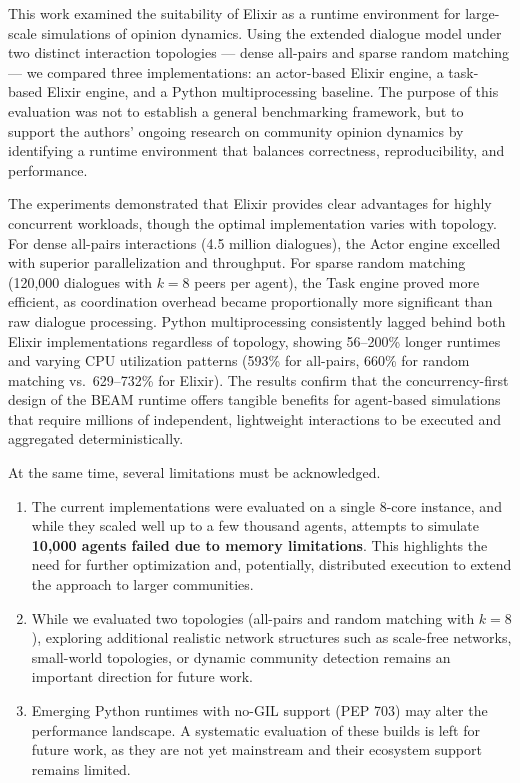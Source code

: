 \documentclass[
]{ceurart}
\begin{document}
This work examined the suitability of Elixir as a runtime environment for large-scale simulations of opinion dynamics. Using the extended dialogue model under two distinct interaction topologies --- dense all-pairs and sparse random matching --- we compared three implementations: an actor-based Elixir engine, a task-based Elixir engine, and a Python multiprocessing baseline. The purpose of this evaluation was not to establish a general benchmarking framework, but to support the authors' ongoing research on community opinion dynamics by identifying a runtime environment that balances correctness, reproducibility, and performance.

The experiments demonstrated that Elixir provides clear advantages for highly concurrent workloads, though the optimal implementation varies with topology. For dense all-pairs interactions (4.5 million dialogues), the Actor engine excelled with superior parallelization and throughput. For sparse random matching (120,000 dialogues with $k=8$ peers per agent), the Task engine proved more efficient, as coordination overhead became proportionally more significant than raw dialogue processing. Python multiprocessing consistently lagged behind both Elixir implementations regardless of topology, showing 56--200\% longer runtimes and varying CPU utilization patterns (593\% for all-pairs, 660\% for random matching vs.\ 629--732\% for Elixir). The results confirm that the concurrency-first design of the BEAM runtime offers tangible benefits for agent-based simulations that require millions of independent, lightweight interactions to be executed and aggregated deterministically.

At the same time, several limitations must be acknowledged. 
\begin{enumerate}
    \item The current implementations were evaluated on a single 8-core instance, and while they scaled well up to a few thousand agents, attempts to simulate \textbf{10,000 agents failed due to memory limitations}. This highlights the need for further optimization and, potentially, distributed execution to extend the approach to larger communities. 
    \item While we evaluated two topologies (all-pairs and random matching with $k=8$), exploring additional realistic network structures such as scale-free networks, small-world topologies, or dynamic community detection remains an important direction for future work. 
    \item Emerging Python runtimes with no-GIL support (PEP 703) may alter the performance landscape. A systematic evaluation of these builds is left for future work, as they are not yet mainstream and their ecosystem support remains limited.
\end{enumerate}
\end{document}
